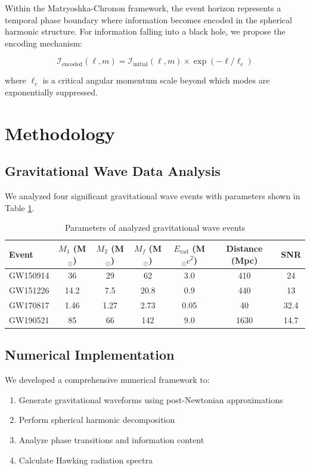 \documentclass[12pt,a4paper]{article}
\begin{document}
Within the Matryoshka-Chronon framework, the event horizon represents a temporal phase boundary where information becomes encoded in the spherical harmonic structure. For information falling into a black hole, we propose the encoding mechanism:

\begin{equation}
\mathcal{I}_{\text{encoded}}(\ell,m) = \mathcal{I}_{\text{initial}}(\ell,m) \times \exp(-\ell/\ell_c)
\end{equation}

where $\ell_c$ is a critical angular momentum scale beyond which modes are exponentially suppressed.

\section{Methodology}

\subsection{Gravitational Wave Data Analysis}

We analyzed four significant gravitational wave events with parameters shown in Table \ref{tab:gw_events}.

\begin{table}[h]
\centering
\caption{Parameters of analyzed gravitational wave events}
\label{tab:gw_events}
\begin{tabular}{lcccccc}
\toprule
Event & $M_1$ (M$_\odot$) & $M_2$ (M$_\odot$) & $M_f$ (M$_\odot$) & $E_{\text{rad}}$ (M$_\odot c^2$) & Distance (Mpc) & SNR \\
\midrule
GW150914 & 36 & 29 & 62 & 3.0 & 410 & 24 \\
GW151226 & 14.2 & 7.5 & 20.8 & 0.9 & 440 & 13 \\
GW170817 & 1.46 & 1.27 & 2.73 & 0.05 & 40 & 32.4 \\
GW190521 & 85 & 66 & 142 & 9.0 & 1630 & 14.7 \\
\bottomrule
\end{tabular}
\end{table}

\subsection{Numerical Implementation}

We developed a comprehensive numerical framework to:
\begin{enumerate}
\item Generate gravitational waveforms using post-Newtonian approximations
\item Perform spherical harmonic decomposition
\item Analyze phase transitions and information content
\item Calculate Hawking radiation spectra
\end{enumerate}
\end{document}
